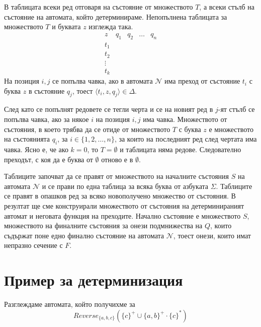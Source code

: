 \documentclass[12pt]{article}
\begin{document}
В таблицата всеки ред отговаря на състояние от множеството \(T\),
а всеки стълб на състояние на автомата, който детерминираме.
Непопълнена таблицата за множеството \(T\) и буквата \(z\) изглежда така.
\[
    \begin{array}{c|cccc}
    z   & q_1 & q_2 & \hdots & q_n \\ \hline
    t_1 &     &     &        &    \\
    t_2 &     &     &        &    \\
    \vdots &     &     &        &    \\
    t_k &     &     &        &   
    \end{array}
\]
На позиция \(i, j\) се попълва чавка, ако в автомата \(\mathcal{N}\) има преход от състояние \(t_i\) с буква \(z\) в състояние \(q_j\),
тоест \(\langle t_i, z, q_j \rangle \in \Delta\). \\\par
След като се попълнят редовете се тегли черта и се на новият ред в \(j\)-ят стълб се попълва чавка,
ако за някое \(i\) на позиция \(i, j\) има чавка.
Множеството от състояния, в което трябва да се отиде от множеството \(T\) с буква \(z\) е множеството на състоянията \(q_i\),
за \(i \in \{1, 2, \dots, n\}\), за които на последният ред след чертата има чавка.
Ясно е, че ако \(k = 0\), то \(T = \emptyset\) и таблицата няма редове.
Следователно преходът, с коя да е буква от \(\emptyset\) отново е в \(\emptyset\). \\\par
Таблиците започват да се правят от множеството на началните състояния \(S\) на автомата \(\mathcal{N}\)
и се прави по една таблица за всяка буква от азбуката \(\Sigma\).
Таблиците се правят в опашков ред за всяко новополучено множество от състояния.
В резултат ще сме конструирали множеството от състояния на детерминираният автомат и неговата функция на преходите.
Начално състояние е множеството \(S\), множеството на финалните състояния за онези подмнижества на \(Q\),
които съдържат поне едно финално състояние на автомата \(\mathcal{N}\), тоест онези, които имат непразно сечение с \(F\).

\section{Пример за детерминизация}
Разглеждаме автомата, който получихме за
\[Reverse_{\{a,b, c\}}(\{c\}^+ \cup \{a, b\}^+ \cdot \{c\}^*)\]

\begin{center}
\end{center}
\end{document}
